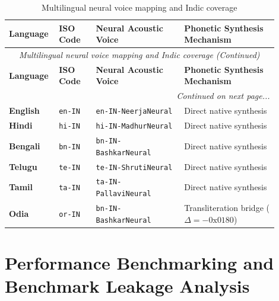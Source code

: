 \small
\begin{longtable}{@{}p{0.13\linewidth} p{0.13\linewidth} p{0.31\linewidth} p{0.33\linewidth}@{}}
\caption{Multilingual neural voice mapping and Indic coverage}\label{tab:6_5} \\
\toprule
\textbf{Language} & \textbf{ISO Code} & \textbf{Neural Acoustic Voice} & \textbf{Phonetic Synthesis Mechanism} \\
\midrule
\endfirsthead
\toprule
\multicolumn{4}{c}{\small\textit{Multilingual neural voice mapping and Indic coverage (Continued)}} \\[4pt]
\midrule
\textbf{Language} & \textbf{ISO Code} & \textbf{Neural Acoustic Voice} & \textbf{Phonetic Synthesis Mechanism} \\
\midrule
\endhead
\midrule
\multicolumn{4}{r}{\footnotesize\textit{Continued on next page...}} \\
\bottomrule
\endfoot
\bottomrule
\endlastfoot
\textbf{English} & \texttt{en-IN} & \texttt{en-IN-NeerjaNeural} & Direct native synthesis \\
\textbf{Hindi} & \texttt{hi-IN} & \texttt{hi-IN-MadhurNeural} & Direct native synthesis \\
\textbf{Bengali} & \texttt{bn-IN} & \texttt{bn-IN-BashkarNeural} & Direct native synthesis \\
\textbf{Telugu} & \texttt{te-IN} & \texttt{te-IN-ShrutiNeural} & Direct native synthesis \\
\textbf{Tamil} & \texttt{ta-IN} & \texttt{ta-IN-PallaviNeural} & Direct native synthesis \\
\textbf{Odia} & \texttt{or-IN} & \texttt{bn-IN-BashkarNeural} & Transliteration bridge ($\Delta = -0\text{x}0180$) \\
\end{longtable}
\normalsize

\section{Performance Benchmarking and Benchmark Leakage Analysis}
\label{sec:benchmarking_leakage}

